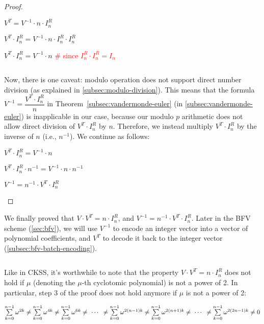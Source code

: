 \begin{proof}
\begin{enumerate}
$V^T = V^{-1} \cdot n \cdot I_n^R$

$V^T \cdot I_n^R = V^{-1} \cdot n \cdot I_n^R  \cdot I_n^R$

$V^T \cdot I_n^R = V^{-1} \cdot n$ \textcolor{red}{\text{ } \# since $I_n^R  \cdot I_n^R = I_n$}

$ $

Now, there is one caveat: modulo operation does not support direct number division (as explained in \autoref{subsec:modulo-division}). This means that the formula $V^{-1} = \dfrac{V^T \cdot I_n^R}{n}$ in Theorem~\ref*{subsec:vandermonde-euler} (in \autoref{subsec:vandermonde-euler}) is inapplicable in our case, because our modulo $p$ arithmetic does not allow direct division of $V^T \cdot I_n^R$ by $n$. Therefore, we instead multiply $V^T \cdot I_n^R$ by the inverse of $n$ (i.e., $n^{-1}$). We continue as follows:

$V^T \cdot I_n^R = V^{-1} \cdot n$

$V^T \cdot I_n^R \cdot n^{-1}= V^{-1} \cdot n \cdot n^{-1}$

$V^{-1} = n^{-1}\cdot V^T \cdot I_n^R$

\end{enumerate}
\end{proof}

We finally proved that $V\cdot V^T = n \cdot I_n^R$, and $V^{-1} = n^{-1}\cdot V^T \cdot I_n^R$. Later in the BFV scheme (\autoref{sec:bfv}), we will use $V^{-1}$ to encode an integer vector into a vector of polynomial coefficients, and $V^T$ to decode it back to the integer vector (\autoref{subsec:bfv-batch-encoding}).

$ $

 Like in CKSS, it's worthwhile to note that the property $V\cdot V^T = n\cdot I_n^R$ does not hold if $\mu$ (denoting the $\mu$-th cyclotomic polynomial) is not a power of 2. In particular, step 3 of the proof does not hold anymore if $\mu$ is not a power of 2:

$\sum\limits_{k=0}^{n-1} \omega^{2k} \neq \sum\limits_{k=0}^{n-1} \omega^{4k} \neq \sum\limits_{k=0}^{n-1} \omega^{6k} \neq \text{ } \text{$\cdots$} \text{ } \neq \sum\limits_{k=0}^{n-1} \omega^{2(n-1)k} \neq \sum\limits_{k=0}^{n-1} \omega^{2(n+1)k} \neq \text{ } \text{$\cdots$} \text{ } \neq \sum\limits_{k=0}^{n-1} \omega^{2(2n-1)k} \neq 0$
